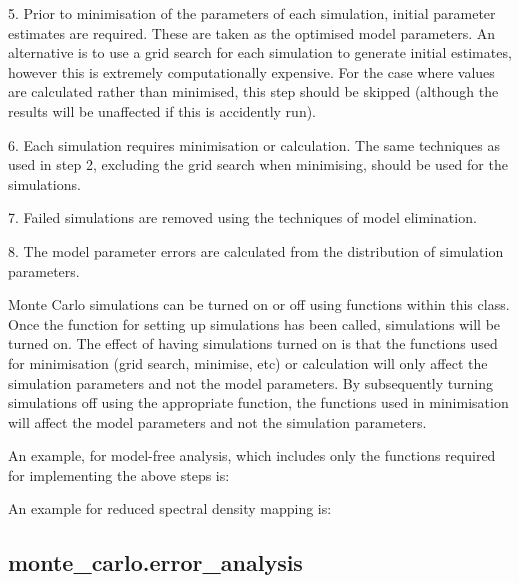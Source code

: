 5.  Prior to minimisation of the parameters of each simulation, initial parameter estimates
are required.  These are taken as the optimised model parameters.  An alternative is to use
a grid search for each simulation to generate initial estimates, however this is extremely
computationally expensive.  For the case where values are calculated rather than minimised,
this step should be skipped (although the results will be unaffected if this is accidently
run).

6.  Each simulation requires minimisation or calculation.  The same techniques as used in
step 2, excluding the grid search when minimising, should be used for the simulations.

7.  Failed simulations are removed using the techniques of model elimination.

8.  The model parameter errors are calculated from the distribution of simulation
parameters.


Monte Carlo simulations can be turned on or off using functions within this class.  Once the
function for setting up simulations has been called, simulations will be turned on.  The
effect of having simulations turned on is that the functions used for minimisation (grid
search, minimise, etc) or calculation will only affect the simulation parameters and not the
model parameters.  By subsequently turning simulations off using the appropriate function,
the functions used in minimisation will affect the model parameters and not the simulation
parameters.


An example, for model-free analysis, which includes only the functions required for
implementing the above steps is:




An example for reduced spectral density mapping is:





\newpage

\subsection{monte\_carlo.error\_analysis}


